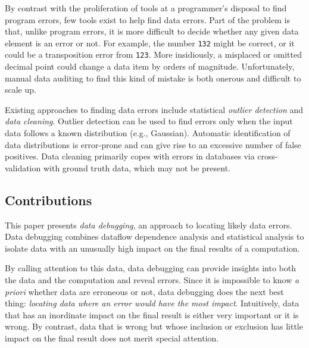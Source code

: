 


By contrast with the proliferation of tools at a programmer's disposal
to find program errors, few tools exist to help find data errors. Part
of the problem is that, unlike program errors, it is more difficult to
decide whether any given data element is an error or not. For example,
the number \texttt{132} might be correct, or it could be a
transposition error from \texttt{123}. More insidiously, a misplaced
or omitted decimal point could change a data item by orders of
magnitude. Unfortunately, manual data auditing to find this kind of
mistake is both onerous and difficult to scale up.



Existing approaches to finding data errors include
statistical \emph{outlier detection} and \emph{data cleaning}. Outlier
detection can be used to find errors only when the input data follows
a known distribution (e.g., Gaussian). Automatic identification of
data distributions is error-prone and can give rise to an excessive
number of false positives. Data cleaning primarily copes with errors
in databases via cross-validation with ground truth data, which may
not be present.

\subsection*{Contributions}


This paper presents \emph{data debugging}, an approach to locating
likely data errors.  Data debugging combines dataflow dependence
analysis and statistical analysis to isolate data with an
unusually high impact on the final results of a computation.

By calling attention to this data, data debugging can provide insights
into both the data and the computation and reveal errors. Since it is
impossible to know \emph{a priori} whether data are erroneous or not,
data debugging does the next best thing: \emph{locating data where an
error would have the most impact}. Intuitively, data that has an
inordinate impact on the final result is either very important or it
is wrong. By contrast, data that is wrong but whose inclusion or
exclusion has little impact on the final result does not merit special
attention.


